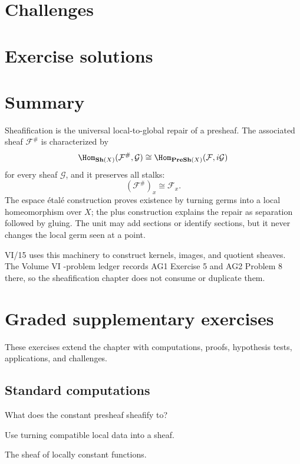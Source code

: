 \section{Challenges}


\ifdefined\IncludeExerciseSolutions
\section{Exercise solutions}

\fi

\section*{Summary}

Sheafification is the universal local-to-global repair of a presheaf.  The associated sheaf
$\mathcal F^\#$ is characterized by
\[
\Hom_{\Sh(X)}(\mathcal F^\#,\mathcal G)
\cong
\Hom_{\PreSh(X)}(\mathcal F,i\mathcal G)
\]
for every sheaf $\mathcal G$, and it preserves all stalks:
\[
(\mathcal F^\#)_x\cong\mathcal F_x.
\]
The espace \'{e}tal\'{e} construction proves existence by turning germs into a local
homeomorphism over $X$; the plus construction explains the repair as separation followed by
gluing.  The unit may add sections or identify sections, but it never changes the local germ
seen at a point.

VI/15 uses this machinery to construct kernels, images, and quotient sheaves.  The Volume VI
-problem ledger records AG1 Exercise 5 and AG2 Problem 8 there, so the sheafification
chapter does not consume or duplicate them.
\section{Graded supplementary exercises}
These exercises extend the chapter with computations, proofs, hypothesis tests, applications, and challenges.

\subsection*{Standard computations}

\begin{exercise}\label{exr:vi14-expand-01}
What does the constant presheaf sheafify to?
\end{exercise}
\begin{hint}
Use turning compatible local data into a sheaf.
\end{hint}
\begin{solution}
The sheaf of locally constant functions.
\end{solution}

